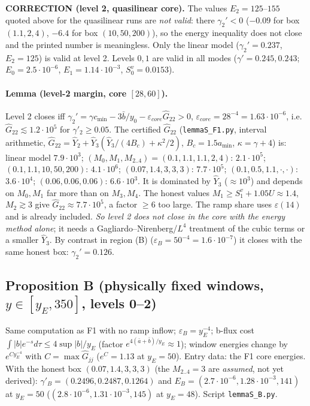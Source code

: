 \documentclass[11pt]{article}
\begin{document}
\textbf{CORRECTION (level 2, quasilinear core).} The values $E_2=125$--$155$ quoted above for the quasilinear runs are \emph{not valid}: there $\gamma_2'<0$ ($-0.09$ for box $(1.1,2,4)$, $-6.4$ for box $(10,50,200)$), so the energy inequality does not close and the printed number is meaningless. Only the linear model ($\gamma_2'=0.237$, $E_2=125$) is valid at level 2. Levels $0,1$ are valid in all modes ($\gamma'=0.245,0.243$; $E_0=2.5\cdot10^{-6}$, $E_1=1.14\cdot10^{-3}$, $S_0^v=0.0153$).

\paragraph{Lemma (level-2 margin, core $[28,60]$).}
Level 2 closes iff $\gamma_2'=\gamma c_{\min}-3\bar b/y_0-\varepsilon_{core}\hat G_{22}>0$, $\varepsilon_{core}=28^{-4}=1.63\cdot10^{-6}$, i.e. $\hat G_{22}\lesssim1.2\cdot10^{5}$ for $\gamma'_2\ge0.05$. The certified $\hat G_{22}$ (\texttt{lemmaS\_F1.py}, interval arithmetic, $\hat G_{22}=\hat Y_{2}+\hat Y_3(\hat Y_3/(4B_c)+\kappa^2/2)$, $B_c=1.5a_{\min}$, $\kappa=\gamma+4$) is: linear model $7.9\cdot10^3$; $(M_0,M_1,M_{2..4})=(0.1,1.1,1.1,2,4)$: $2.1\cdot10^5$; $(0.1,1.1,10,50,200)$: $4.1\cdot10^6$; $(0.07,1.4,3,3,3)$: $7.7\cdot10^5$; $(0.1,0.5,1.1,\cdot,\cdot)$: $3.6\cdot10^4$; $(0.06,0.06,0.06)$: $6.6\cdot10^3$. It is dominated by $\hat Y_3$ ($\approx 10^3$) and depends on $M_0,M_1$ far more than on $M_3,M_4$. The honest values $M_1\ge S_1^v+1.05U\approx1.4$, $M_2\gtrsim3$ give $\hat G_{22}\approx7.7\cdot10^5$, a factor $\ge6$ too large. The ramp share uses $\varepsilon(14)$ and is already included. \emph{So level 2 does not close in the core with the energy method alone}; it needs a Gagliardo--Nirenberg/$L^4$ treatment of the cubic terms or a smaller $\hat Y_3$. By contrast in region (B) ($\varepsilon_B=50^{-4}=1.6\cdot10^{-7}$) it closes with the same honest box: $\gamma_2'=0.126$.


\subsection*{Proposition B (physically fixed windows, $y\in[y_E,350]$, levels 0--2)}
Same computation as F1 with no ramp inflow; $\varepsilon_B=y_E^{-4}$; b-flux cost $\int|b|e^{-s}d\tau\le4\sup|b|/y_E$ (factor $e^{4(\bar a+\bar b)/y_E}\approx1$); window energies change by $e^{C y_E^{-4}}$ with $C=\max\hat G_{jj}$ ($e^C=1.13$ at $y_E=50$). Entry data: the F1 core energies. With the honest box $(0.07,1.4,3,3,3)$ (the $M_{2..4}=3$ are \emph{assumed}, not yet derived): $\gamma'_B=(0.2496,0.2487,0.1264)$ and $E_B=(2.7\cdot10^{-6},1.28\cdot10^{-3},141)$ at $y_E=50$ ($(2.8\cdot10^{-6},1.31\cdot10^{-3},145)$ at $y_E=48$). Script \texttt{lemmaS\_B.py}.
\end{document}
